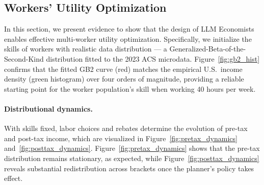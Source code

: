 \subsection{Workers' Utility Optimization}\label{subsub:worker}

In this section, we present evidence to show that the design of LLM Economists enables effective multi-worker utility optimization. Specifically, we initialize the skills of workers with realistic data distribution --- a Generalized-Beta-of-the-Second-Kind distribution fitted to the 2023 ACS microdata.  
Figure~\ref{fig:gb2_hist} confirms that the fitted GB2 curve (red) matches the empirical U.S.\ income density (green histogram) over four orders of magnitude, providing a reliable starting point for the worker population's skill when working 40 hours per week.


\paragraph{Distributional dynamics.}
With skills fixed, labor choices and rebates determine the evolution of pre-tax and post-tax income, which are visualized in Figure~\ref{fig:pretax_dynamics} and~\ref{fig:posttax_dynamics}.  
Figure~\ref{fig:pretax_dynamics} shows that the pre-tax distribution remains stationary, as expected, while Figure~\ref{fig:posttax_dynamics} reveals substantial redistribution
across brackets once the planner’s policy takes effect.

